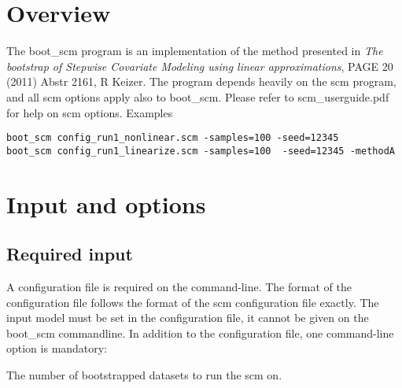 



\maketitle


\section{Overview}

The boot\_scm program is an implementation of the method presented in
\emph{The bootstrap of Stepwise Covariate Modeling using linear approximations},
PAGE 20 (2011) Abstr 2161, R Keizer.
The program depends heavily on the scm program, and all scm options apply also to boot\_scm. Please refer to scm\_userguide.pdf for help on scm options.
Examples
\begin{verbatim}
boot_scm config_run1_nonlinear.scm -samples=100 -seed=12345
boot_scm config_run1_linearize.scm -samples=100  -seed=12345 -methodA
\end{verbatim}

\section{Input and options}
\subsection{Required input}
A configuration file is required on the command-line. The format of the configuration file follows the format of the scm configuration file exactly. 
The input model must be set in the configuration file, it cannot be given on the boot\_scm commandline. 
In addition to the configuration file, one command-line option is mandatory:
\begin{optionlist}
The number of bootstrapped datasets to run the scm on. 
\nextopt
\end{optionlist}

